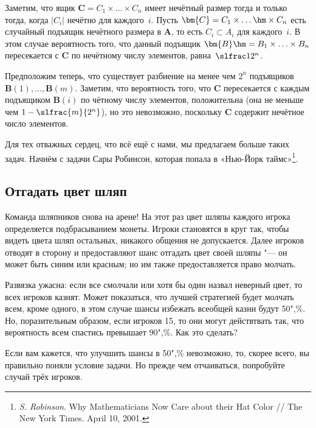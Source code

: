 \documentclass[twoside]{book}
\makeatletter
\newcommand{\rindex}[2][\imki@jobname]{%
\index[#1]{\detokenize{#2}}%
}
\makeatother
\begin{document}
Заметим, что ящик $\bm{C}=C_1 \times\ldots\times C_n$ имеет нечётный размер тогда и только тогда, когда $|C_i|$ нечётно для каждого~$i$.
Пусть $\bm{C}=C_1 \times \ldots \hm\times C_n$ есть случайный подъящик нечётного размера в $\bm{A}$, то есть $C_i\subset A_i$ для каждого~$i$.
В этом случае вероятность того, что данный подъящик $\bm{B}\hm=B_1\times\ldots\times B_n$ пересекается с $\bm{C}$ по нечётному числу элементов, равна~$\slfrac1{2^n}$.

Предположим теперь, что существует разбиение на менее чем $2^n$ подъящиков $\bm{B}(1),\dots,\bm{B}(m)$.
Заметим, что вероятность того, что $\bm{C}$ пересекается с каждым подъящиком $\bm{B}(i)$ по чётному числу элементов, положительна (она не меньше чем $1-\slfrac{m}{2^n}$),
но это невозможно, поскольку $\bm{C}$ содержит нечётное число элементов.
\heart

\medskip

Для тех отважных сердец, что всё ещё с нами, мы предлагаем больше таких задач.
Начнём с задачи Сары Робинсон, которая попала в «Нью-Йорк таймс»\footnote{\emph{S. Robinson}. Why Mathematicians Now Care about their Hat Color /\!/ {The New York Times}. April 10, 2001.}.

\subsection*{Отгадать цвет шляп}
\rindex{Отгадать цвет шляп}

Команда шляпников снова на арене!
%
На этот раз цвет шляпы каждого игрока определяется подбрасыванием монеты.
Игроки становятся в круг так, чтобы видеть цвета шляп остальных, никакого общения не допускается.
Далее игроков отводят в сторону и предоставляют шанс отгадать цвет своей шляпы "--- он может быть синим или красным;
но им также предоставляется право молчать.

Развязка ужасна: если все смолчали или хотя бы один назвал неверный цвет, то всех игроков казнят.
Может показаться, что лучшей стратегией будет молчать всем, кроме
одного, в этом случае шансы избежать всеобщей казни будут 50",\%.
Но, поразительным образом, если игроков 15, %
то они могут действтвать так, что вероятность всем спастись превышает 90",\%. 
Как это сделать?


Если вам кажется, что улучшить шансы в 50",\% невозможно, то, скорее всего, вы правильно поняли условие задачи.
Но прежде чем отчаиваться, попробуйте случай трёх игроков.
\end{document}
